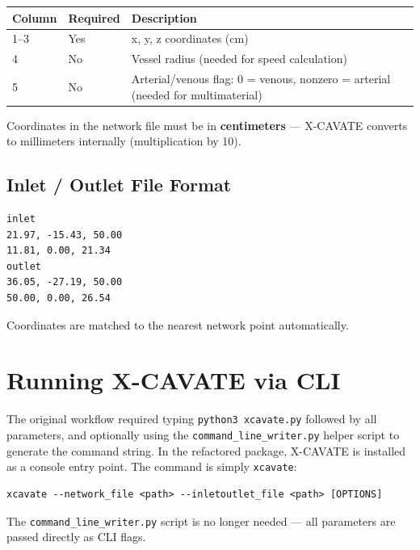 \documentclass[11pt,letterpaper]{article}
\newcommand{\code}[1]{\texttt{#1}}
\begin{document}
\begin{tabularx}{\textwidth}{l l X}
\toprule
\textbf{Column} & \textbf{Required} & \textbf{Description} \\
\midrule
1--3 & Yes & x, y, z coordinates (cm) \\
4    & No  & Vessel radius (needed for speed calculation) \\
5    & No  & Arterial/venous flag: 0 = venous, nonzero = arterial (needed for multimaterial) \\
\bottomrule
\end{tabularx}

\begin{warnbox}
Coordinates in the network file must be in \textbf{centimeters} --- X-CAVATE
converts to millimeters internally (multiplication by 10).
\end{warnbox}

\subsection{Inlet / Outlet File Format}

\begin{lstlisting}
inlet
21.97, -15.43, 50.00
11.81, 0.00, 21.34
outlet
36.05, -27.19, 50.00
50.00, 0.00, 26.54
\end{lstlisting}

Coordinates are matched to the nearest network point automatically.

\section{Running X-CAVATE via CLI}
\label{sec:cli}

\begin{claudebox}
The original workflow required typing \code{python3 xcavate.py} followed by
all parameters, and optionally using the \code{command\_line\_writer.py} helper
script to generate the command string. In the refactored package, X-CAVATE is
installed as a console entry point. The command is simply \code{xcavate}:

\begin{lstlisting}
xcavate --network_file <path> --inletoutlet_file <path> [OPTIONS]
\end{lstlisting}

The \code{command\_line\_writer.py} script is no longer needed --- all
parameters are passed directly as CLI flags.
\end{claudebox}
\end{document}
